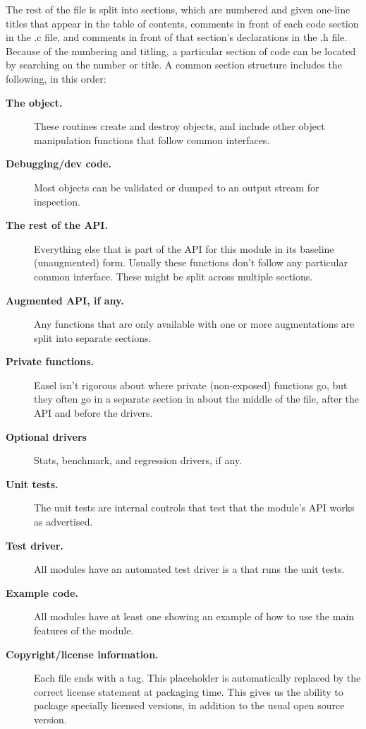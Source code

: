 

The rest of the file is split into sections, which are numbered and
given one-line titles that appear in the table of contents, comments
in front of each code section in the .c file, and comments in front of
that section's declarations in the .h file. Because of the numbering
and titling, a particular section of code can be located by searching
on the number or title.  A common section structure includes the
following, in this order:

\begin{description}

\item[\textbf{The  object.}]
  These routines create and destroy objects, and include
  other object manipulation functions that follow common interfaces.

\item[\textbf{Debugging/dev code.}]
  Most objects can be validated or dumped to an output stream
  for inspection.

\item[\textbf{The rest of the API.}]
  Everything else that is part of the API for this module in its
  baseline (unaugmented) form. Usually these functions don't follow
  any particular common interface.  These might be split across
  multiple sections.

\item[\textbf{Augmented API, if any.}]
  Any functions that are only available with one or more augmentations
  are split into separate sections. 

\item[\textbf{Private functions.}]
  Easel isn't rigorous about where private (non-exposed) functions go,
  but they often go in a separate section in about the middle of the
   file, after the API and before the drivers.

\item[\textbf{Optional drivers}] Stats, benchmark, and regression
  drivers, if any.

\item [\textbf{Unit tests.}]
  The unit tests are internal controls that test that the module's API
  works as advertised.

\item [\textbf{Test driver.}]
  All modules have an automated test driver is a  that
  runs the unit tests.
 
\item [\textbf{Example code.}]
  All modules have at least one  showing an example of
  how to use the main features of the module.

\item [\textbf{Copyright/license information.}]  Each file ends with a
   tag. This placeholder is automatically replaced by
  the correct license statement at packaging time. This gives us the
  ability to package specially licensed versions, in addition to the
  usual open source version.
\end{description}



